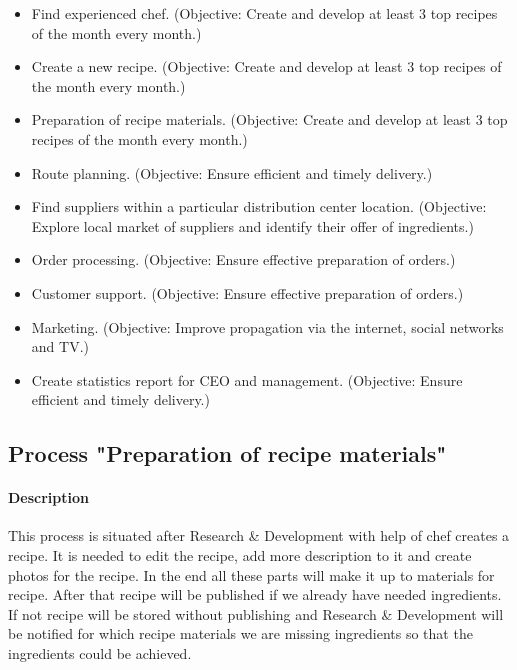 \documentclass[11pt,a4paper]{article}
\begin{document}
\begin{itemize}
    \item Find experienced chef. (Objective: Create and develop at least 3 top recipes of the month every month.)
    \item Create a new recipe. (Objective: Create and develop at least 3 top recipes of the month every month.)
    \item Preparation of recipe materials. (Objective: Create and develop at least 3 top recipes of the month every month.)
    \item Route planning. (Objective: Ensure efficient and timely delivery.)
    \item Find suppliers within a particular distribution center location. (Objective: Explore local market of suppliers and identify their offer of ingredients.)
    \item Order processing. (Objective: Ensure effective preparation of orders.)
    \item Customer support. (Objective: Ensure effective preparation of orders.)
    \item Marketing. (Objective: Improve propagation via the internet, social networks and TV.)
    \item Create statistics report for CEO and management. (Objective: Ensure efficient and timely delivery.)
\end{itemize}

\newpage


\subsection{Process "Preparation of recipe materials"}

\paragraph{Description}

This process is situated after Research \& Development with help of chef creates a recipe. It is needed to edit the recipe, add more description to it and create photos for the recipe. In the end all these parts will make it up to materials for recipe. After that recipe will be published if we already have needed ingredients. If not recipe will be stored without publishing and Research \& Development will be notified for which recipe materials we are missing ingredients so that the ingredients could be achieved.
\end{document}
